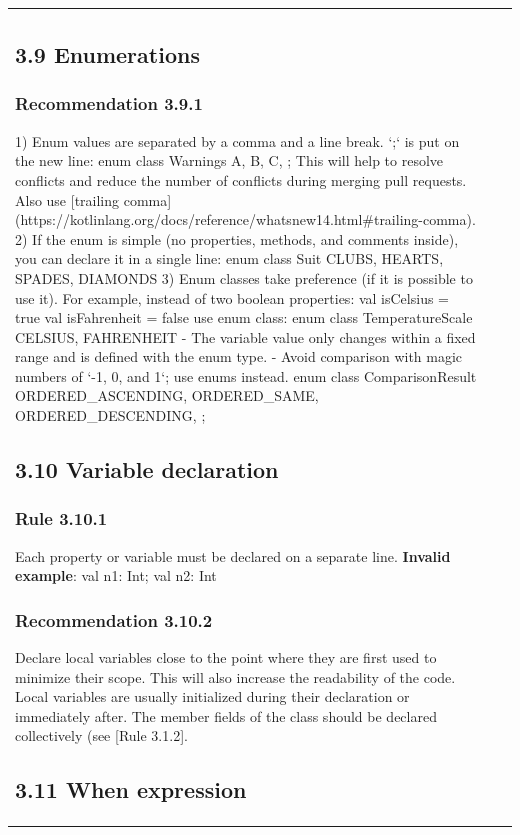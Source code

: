 \begin{center}
\begin{tabular}{ |p{}|p{}|p{}| }
{{{{{\subsection*{\textbf{3.9 Enumerations}}
\subsubsection*{\textbf{Recommendation 3.9.1}}
1) Enum values are separated by a comma and a line break. `;` is put on the new line:
enum class Warnings {
    A,
    B,
    C,
    ;
}
This will help to resolve conflicts and reduce the number of conflicts during merging pull requests.
Also use [trailing comma](https://kotlinlang.org/docs/reference/whatsnew14.html\#trailing-comma).
2) If the enum is simple (no properties, methods, and comments inside), you can declare it in a single line:
enum class Suit { CLUBS, HEARTS, SPADES, DIAMONDS }
3) Enum classes take preference (if it is possible to use it). For example, instead of two boolean properties:
val isCelsius = true
val isFahrenheit = false
use enum class:
enum class TemperatureScale { CELSIUS, FAHRENHEIT }
- The variable value only changes within a fixed range and is defined with the enum type.
- Avoid comparison with magic numbers of `-1, 0, and 1`; use enums instead.
enum class ComparisonResult {
    ORDERED_ASCENDING,
    ORDERED_SAME,
    ORDERED_DESCENDING,
    ;
}
\subsection*{\textbf{3.10 Variable declaration}}
\subsubsection*{\textbf{Rule 3.10.1}}
Each property or variable must be declared on a separate line.
\textbf{Invalid example}:
val n1: Int; val n2: Int
\subsubsection*{\textbf{Recommendation 3.10.2}}
Declare local variables close to the point where they are first used to minimize their scope. This will also increase the readability of the code.
Local variables are usually initialized during their declaration or immediately after.
The member fields of the class should be declared collectively (see [Rule 3.1.2].
\subsection*{\textbf{3.11 When expression}}
}}}}}
\end{tabular}
\end{center}

